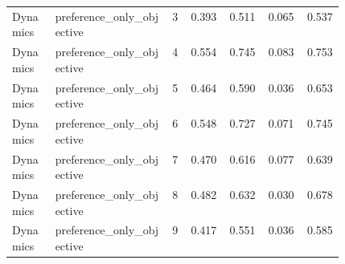 \documentclass{article}
\begin{document}
\begin{center}
\begin{longtable}{p{0.13\linewidth}p{0.35\linewidth}rrrrr}
Dynamics & preference\_only\_objective & 3 & 0.393 & 0.511 & 0.065 & 0.537\\
Dynamics & preference\_only\_objective & 4 & 0.554 & 0.745 & 0.083 & 0.753\\
Dynamics & preference\_only\_objective & 5 & 0.464 & 0.590 & 0.036 & 0.653\\
Dynamics & preference\_only\_objective & 6 & 0.548 & 0.727 & 0.071 & 0.745\\
Dynamics & preference\_only\_objective & 7 & 0.470 & 0.616 & 0.077 & 0.639\\
Dynamics & preference\_only\_objective & 8 & 0.482 & 0.632 & 0.030 & 0.678\\
Dynamics & preference\_only\_objective & 9 & 0.417 & 0.551 & 0.036 & 0.585\\
\bottomrule
\end{longtable}
\normalsize
\end{center}


\end{document}
